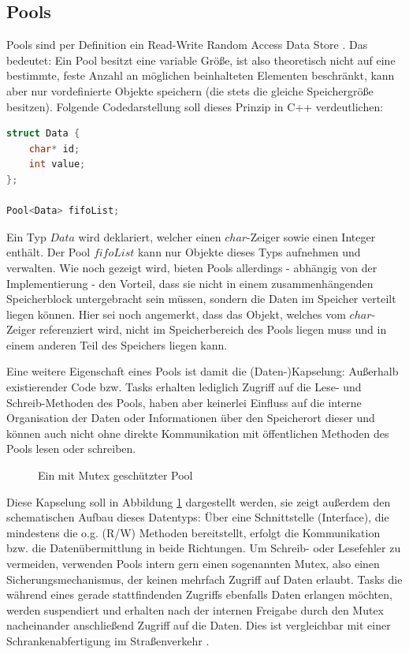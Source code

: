 \documentclass{llncs}
\begin{document}
\subsection{Pools}
\label{subsec:Pools}
Pools sind per Definition ein Read-Write Random Access Data Store \autocite[vgl.][94]{Cooling2017}. Das bedeutet: Ein Pool besitzt eine variable Größe, ist also theoretisch nicht auf eine bestimmte, feste Anzahl an möglichen beinhalteten Elementen beschränkt, kann aber nur vordefinierte Objekte speichern (die stets die gleiche Speichergröße besitzen). Folgende Codedarstellung soll dieses Prinzip in C++ verdeutlichen:
\begin{lstlisting}[language=C++]
struct Data {
	char* id;
	int value;
};

Pool<Data> fifoList;
\end{lstlisting}
Ein Typ $Data$ wird deklariert, welcher einen $char$-Zeiger sowie einen Integer enthält. Der Pool $fifoList$ kann nur Objekte dieses Typs aufnehmen und verwalten. Wie noch gezeigt wird, bieten Pools allerdings - abhängig von der Implementierung - den Vorteil, dass sie nicht in einem zusammenhängenden Speicherblock untergebracht sein müssen, sondern die Daten im Speicher verteilt liegen können. Hier sei noch angemerkt, dass das Objekt, welches vom $char$-Zeiger referenziert wird, nicht im Speicherbereich des Pools liegen muss und in einem anderen Teil des Speichers liegen kann.

Eine weitere Eigenschaft eines Pools ist damit die (Daten-)Kapselung: Außerhalb existierender Code bzw. Tasks erhalten lediglich Zugriff auf die Lese- und Schreib-Methoden des Pools, haben aber keinerlei Einfluss auf die interne Organisation der Daten oder Informationen über den Speicherort dieser und können auch nicht ohne direkte Kommunikation mit öffentlichen Methoden des Pools lesen oder schreiben.\\

\begin{figure}%
	\centering
	\def\svgwidth{.50\columnwidth}

	
	\caption{\label{fig:Pool}Ein mit Mutex geschützter Pool \autocite[vgl.][95]{Cooling2017}}
\end{figure}

Diese Kapselung soll in Abbildung \ref{fig:Pool} dargestellt werden, sie zeigt außerdem den schematischen Aufbau dieses Datentyps: Über eine Schnittstelle (Interface), die mindestens die o.g. (R/W) Methoden bereitstellt, erfolgt die Kommunikation bzw. die Datenübermittlung in beide Richtungen. Um Schreib- oder Lesefehler zu vermeiden, verwenden Pools intern gern einen sogenannten Mutex, also einen Sicherungsmechanismus, der keinen mehrfach Zugriff auf Daten erlaubt. Tasks die während eines gerade stattfindenden Zugriffs ebenfalls Daten erlangen möchten, werden suspendiert und erhalten nach der internen Freigabe durch den Mutex nacheinander anschließend Zugriff auf die Daten. Dies ist vergleichbar mit einer Schrankenabfertigung im Straßenverkehr \autocite[vgl.][95]{Cooling2017}.\\
\end{document}
